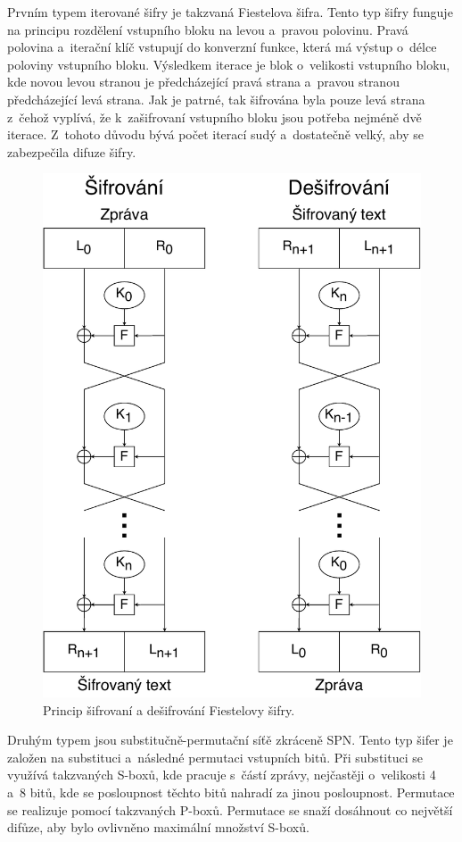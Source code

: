 Prvním typem iterované šifry je takzvaná Fiestelova šifra. Tento typ šifry funguje na principu rozdělení vstupního bloku na levou a~pravou polovinu. Pravá polovina a~iterační klíč vstupují do konverzní funkce, která má výstup o~délce poloviny vstupního bloku. Výsledkem iterace je blok o~velikosti vstupního bloku, kde novou levou stranou je předcházející pravá strana a~pravou stranou předcházející levá strana. Jak je patrné, tak šifrována byla pouze levá strana z~čehož vyplívá, že k~zašifrovaní vstupního bloku jsou potřeba nejméně dvě iterace. Z~tohoto důvodu bývá počet iterací sudý a~dostatečně velký, aby se zabezpečila difuze šifry.\cite{Burda9788021446120ISBN}
\newpage
\begin{figure}[!h]
  \begin{center}
    \includegraphics[scale=0.5]{obrazky/feistelCipher.pdf}
  \end{center}
  \caption[Fiestelova šifr]{Princip šifrovaní a dešifrování Fiestelovy šifry.\cite{FeistelCipher}}
  \label{img:FeistelCipher}
\end{figure}
Druhým typem jsou substitučně-permutační síťě zkráceně SPN. Tento typ šifer je založen na substituci a~následné permutaci vstupních bitů. Při substituci se využívá takzvaných S-boxů, kde pracuje s~částí zprávy, nejčastěji o~velikosti 4 a~8 bitů, kde se posloupnost těchto bitů nahradí za jinou posloupnost. Permutace se realizuje pomocí takzvaných P-boxů. Permutace se snaží dosáhnout co největší difůze, aby bylo ovlivněno maximální množství S-boxů.%

